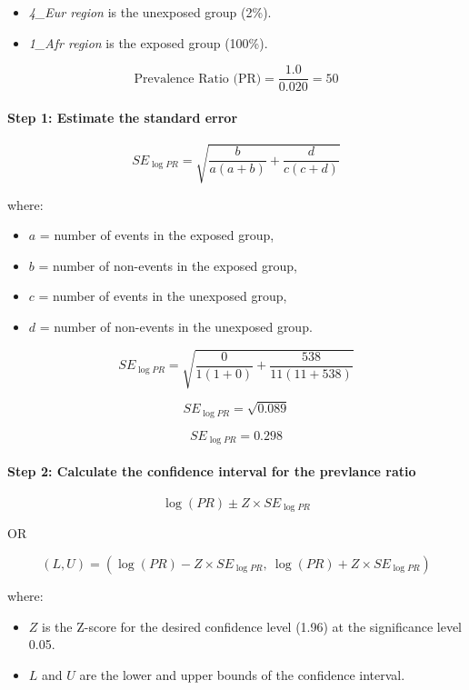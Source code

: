 \begin{itemize}
    \item \textit{4\_Eur region} is the unexposed group (2\%).
    \item \textit{1\_Afr region} is the exposed group (100\%).  
\end{itemize}


\[
\text{Prevalence Ratio (PR)} = \frac{1.0}{0.020} = 50
\]


\paragraph*{Step 1: Estimate the standard error}


\[
SE_{\log PR} = \sqrt{ \frac{b}{a(a+b)} + \frac{d}{c(c+d)} }
\]

where:
\begin{itemize}
    \item \( a \) = number of events in the exposed group,
    \item \( b \) = number of non-events in the exposed group,
    \item \( c \) = number of events in the unexposed group,
    \item \( d \) = number of non-events in the unexposed group.
\end{itemize}


\[
SE_{\log PR} = \sqrt{ \frac{0}{1(1+0)} + \frac{538}{11(11+538)} }
\]

\[
SE_{\log PR} = \sqrt{ 0.089 }
\]

\[
SE_{\log PR} = 0.298
\]

\paragraph*{Step 2: Calculate the confidence interval for the prevlance ratio}

\[
\log(PR) \pm Z \times SE_{\log PR}
\]
\begin{center}
OR
\end{center}
\[
(L, U) = \left( \log(PR) - Z \times SE_{\log PR},\ \log(PR) + Z \times SE_{\log PR} \right)
\]


where:
\begin{itemize}
    \item \( Z \) is the Z-score for the desired confidence level (1.96) at the significance level 0.05.
    \item \( L \) and \( U \) are the lower and upper bounds of the confidence interval.
\end{itemize}


